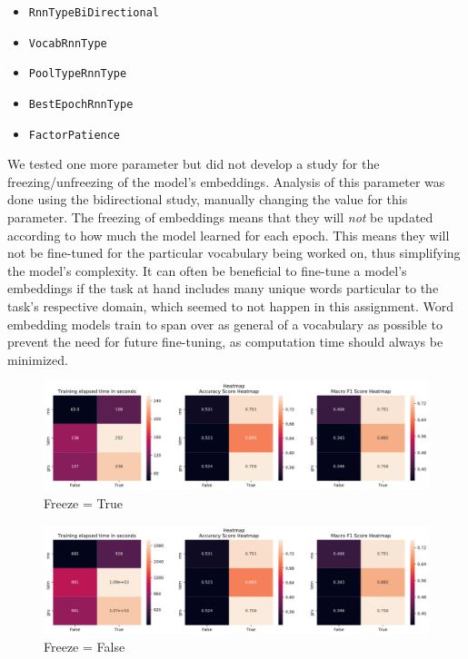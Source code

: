 \begin{itemize}
    \item \texttt{RnnTypeBiDirectional}
    \item \texttt{VocabRnnType}
    \item \texttt{PoolTypeRnnType}
    \item \texttt{BestEpochRnnType}
    \item \texttt{FactorPatience}
\end{itemize}

We tested one more parameter but did not develop a study for the freezing/unfreezing of the model's embeddings. Analysis of this parameter was done using the bidirectional study, manually changing the value for this parameter. The freezing of embeddings means that they will \textit{not} be updated according to how much the model learned for each epoch. This means they will not be fine-tuned for the particular vocabulary being worked on, thus simplifying the model's complexity. It can often be beneficial to fine-tune a model's embeddings if the task at hand includes many unique words particular to the task's respective domain, which seemed to not happen in this assignment. Word embedding models train to span over as general of a vocabulary as possible to prevent the need for future fine-tuning, as computation time should always be minimized. 

\begin{figure}[H]
    \centering
    \includegraphics[width=1\linewidth]{pictures/RnnTypeBiDirectional_freeze_true_heatmap.png}
    \caption{Freeze = True}
    \label{fig:freeze_true}
\end{figure}

\begin{figure}[H]
    \centering
    \includegraphics[width=1\linewidth]{pictures/RnnTypeBiDirectional_freeze_false_heatmap.png}
    \caption{Freeze = False}
    \label{fig:freeze_false}
\end{figure}

